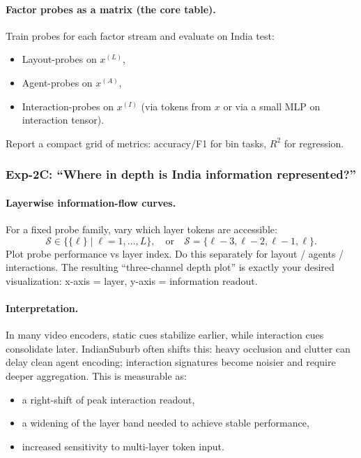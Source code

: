 \paragraph{Factor probes as a matrix (the core table).}
Train probes for each factor stream and evaluate on India test:
\begin{itemize}[leftmargin=*,itemsep=2pt]
  \item Layout-probes on $x^{(L)}$,
  \item Agent-probes on $x^{(A)}$,
  \item Interaction-probes on $x^{(I)}$ (via tokens from $x$ or via a small MLP on interaction tensor).
\end{itemize}
Report a compact grid of metrics: accuracy/F1 for bin tasks, $R^2$ for regression.

\subsubsection{Exp-2C: “Where in depth is India information represented?”}

\paragraph{Layerwise information-flow curves.}
For a fixed probe family, vary which layer tokens are accessible:
\[
\mathcal{S}\in \{\{\ell\}\;|\;\ell=1,\dots,L\},
\quad \text{or}\quad
\mathcal{S}=\{\ell-3,\ell-2,\ell-1,\ell\}.
\]
Plot probe performance vs layer index. Do this separately for layout / agents / interactions. The resulting “three-channel depth plot” is exactly your desired visualization: x-axis = layer, y-axis = information readout.

\paragraph{Interpretation.}
In many video encoders, static cues stabilize earlier, while interaction cues consolidate later. IndianSuburb often shifts this: heavy occlusion and clutter can delay clean agent encoding; interaction signatures become noisier and require deeper aggregation. This is measurable as:
\begin{itemize}[leftmargin=*,itemsep=2pt]
  \item a right-shift of peak interaction readout,
  \item a widening of the layer band needed to achieve stable performance,
  \item increased sensitivity to multi-layer token input.
\end{itemize}

